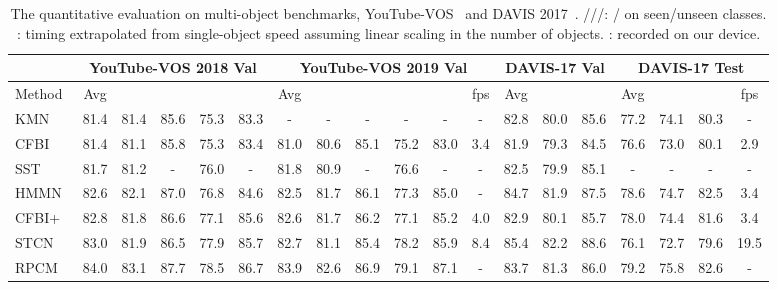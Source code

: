\documentclass{article}
\newcommand{\pub}[1]{{\color{gray}{\tiny{[{#1}]}}}}
\begin{document}
\begin{table}[t!]
	\centering
	\caption{The quantitative evaluation on multi-object benchmarks, YouTube-VOS~\cite{youtubevos} and DAVIS 2017~\cite{davis2017}. ///: / on seen/unseen classes.
    : timing extrapolated from single-object speed assuming linear scaling in the number of objects. : recorded on our device.
	}\label{tab:comparisons}

\vspace{1mm}
\scriptsize

\centering
\setlength{\tabcolsep}{2.8pt}

\begin{tabular}{l|ccccc|ccccc|c|ccc|ccc|c}
	
\toprule[1.5pt]
            &    \multicolumn{5}{c|}{YouTube-VOS 2018 Val}  & \multicolumn{6}{c|}{YouTube-VOS 2019 Val} & \multicolumn{3}{c|}{DAVIS-17 Val}  & \multicolumn{4}{c}{DAVIS-17 Test}  \\
\midrule[1pt]
 Method & Avg &  &  &  &   & Avg &  &  &  &  & fps & Avg &  &   & Avg &  &  & fps \\
\midrule[1pt]
KMN\pub{ECCV20}~\cite{KMN}  &  81.4  &  81.4  &  85.6  &  75.3  &  83.3 & - & - & - & - & - & - &  82.8  & 80.0  & 85.6   &  77.2  & 74.1  & 80.3 & -  \\
CFBI\pub{ECCV20}~\cite{cfbi} &  81.4  &  81.1  & 85.8  & 75.3  & 83.4 &  81.0  &  {80.6}  & {85.1}  & {75.2}  & {83.0} & 3.4 & 81.9  & 79.3  & 84.5 &  76.6  & 73.0  & 80.1 & 2.9  \\
SST\pub{CVPR21}~\cite{sstvos} & 81.7  &  81.2  &  -  &  76.0  &  - & 81.8  &  80.9  &  -  &  76.6  &  - & - &  82.5  & 79.9  & 85.1 & - & - & - & - \\
HMMN\pub{ICCV21}~\cite{hmmn} & 82.6  &  82.1  &  87.0  &  76.8  &  84.6 & 82.5  &  81.7  &  86.1  &  77.3  &  85.0 & -  &  84.7  & 81.9  & 87.5  &  78.6  & 74.7  & 82.5 & 3.4 \\
CFBI+\pub{TPAMI21}~\cite{cfbip} &  82.8  &  81.8  & 86.6  & 77.1  & 85.6  &  82.6  &  81.7  & 86.2  & 77.1  & 85.2 & 4.0  &  82.9  & 80.1  & 85.7  &  78.0  & 74.4  & 81.6 & 3.4 \\
STCN\pub{NeurIPS21}~\cite{cheng2021stcn} &  83.0  &  81.9  & 86.5  & 77.9  & 85.7  &  82.7  &  81.1  & 85.4  & 78.2  & 85.9 & 8.4  &  85.4  & 82.2  & 88.6   &  76.1  & 72.7  & 79.6 & 19.5  \\
RPCM\pub{AAAI22}~\cite{rpcm} &  84.0  &  83.1  & 87.7  & 78.5  & 86.7   &  83.9  &  82.6  & 86.9  & 79.1  & 87.1 & -  &  83.7  & 81.3  & 86.0  & 79.2  & 75.8  & 82.6 & - \\

\end{tabular}
\end{table}
\end{document}
